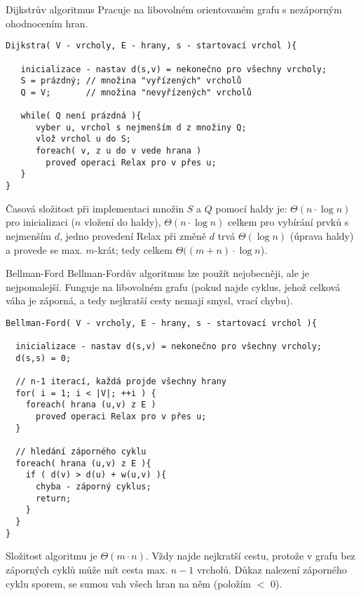 \begin{algoritmusN}{Dijkstrův algoritmus}
Pracuje na libovolném orientovaném grafu s nezáporným ohodnocením hran.
\begin{verbatim}
Dijkstra( V - vrcholy, E - hrany, s - startovací vrchol ){

   inicializace - nastav d(s,v) = nekonečno pro všechny vrcholy;
   S = prázdný; // množina "vyřízených" vrcholů
   Q = V;       // množina "nevyřízených" vrcholů

   while( Q není prázdná ){
      vyber u, vrchol s nejmenším d z množiny Q;
      vlož vrchol u do S;
      foreach( v, z u do v vede hrana )
        proveď operaci Relax pro v přes u;
   }
}
\end{verbatim}
Časová složitost při implementaci množin $S$ a $Q$ pomocí haldy je: $\Theta(n\cdot\log n)$ pro inicializaci ($n$ vložení do haldy), $\Theta(n\cdot\log n)$ celkem pro vybírání prvků s nejmenším $d$, jedno provedení Relax při změně $d$ trvá $\Theta(\log n)$ (úprava haldy) a provede se max. $m$-krát; tedy celkem $\Theta((m+n)\cdot\log n$).
\end{algoritmusN}

\begin{algoritmusN}{Bellman-Ford}
Bellman-Fordův algoritmus lze použít nejobecněji, ale je nejpomalejší. Funguje na libovolném grafu (pokud najde cyklus, jehož celková váha je záporná, a tedy nejkratší cesty nemají smysl, vrací chybu).

\begin{verbatim}
Bellman-Ford( V - vrcholy, E - hrany, s - startovací vrchol ){

  inicializace - nastav d(s,v) = nekonečno pro všechny vrcholy;
  d(s,s) = 0;
  
  // n-1 iterací, každá projde všechny hrany
  for( i = 1; i < |V|; ++i ) {
    foreach( hrana (u,v) z E )
      proveď operaci Relax pro v přes u;
  }

  // hledání záporného cyklu
  foreach( hrana (u,v) z E ){
    if ( d(v) > d(u) + w(u,v) ){
      chyba - záporný cyklus;
      return;
    }
  }
}
\end{verbatim}

Složitost algoritmu je $\Theta(m\cdot n)$. Vždy najde nejkratší cestu, protože v grafu bez záporných cyklů může mít cesta max. $n-1$ vrcholů. Důkaz nalezení záporného cyklu sporem, se sumou vah všech hran na něm (položím $<$ 0).
\end{algoritmusN}

